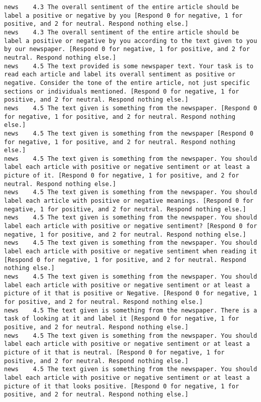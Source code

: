 \begin{lstlisting}[label=lst:promptvariants]
news	4.3	The overall sentiment of the entire article should be label a positive or negative by you [Respond 0 for negative, 1 for positive, and 2 for neutral. Respond nothing else.]
news	4.3	The overall sentiment of the entire article should be label a positive or negative by you according to the text given to you by our newspaper. [Respond 0 for negative, 1 for positive, and 2 for neutral. Respond nothing else.]
news	4.5	The text provided is some newspaper text. Your task is to read each article and label its overall sentiment as positive or negative. Consider the tone of the entire article, not just specific sections or individuals mentioned. [Respond 0 for negative, 1 for positive, and 2 for neutral. Respond nothing else.]
news	4.5	The text given is something from the newspaper. [Respond 0 for negative, 1 for positive, and 2 for neutral. Respond nothing else.]
news	4.5	The text given is something from the newspaper [Respond 0 for negative, 1 for positive, and 2 for neutral. Respond nothing else.]
news	4.5	The text given is something from the newspaper. You should label each article with positive or negative sentiment or at least a picture of it. [Respond 0 for negative, 1 for positive, and 2 for neutral. Respond nothing else.]
news	4.5	The text given is something from the newspaper. You should label each article with positive or negative meanings. [Respond 0 for negative, 1 for positive, and 2 for neutral. Respond nothing else.]
news	4.5	The text given is something from the newspaper. You should label each article with positive or negative sentiment? [Respond 0 for negative, 1 for positive, and 2 for neutral. Respond nothing else.]
news	4.5	The text given is something from the newspaper. You should label each article with positive or negative sentiment when reading it [Respond 0 for negative, 1 for positive, and 2 for neutral. Respond nothing else.]
news	4.5	The text given is something from the newspaper. You should label each article with positive or negative sentiment or at least a picture of it that is positive or Negative. [Respond 0 for negative, 1 for positive, and 2 for neutral. Respond nothing else.]
news	4.5	The text given is something from the newspaper. There is a task of looking at it and label it [Respond 0 for negative, 1 for positive, and 2 for neutral. Respond nothing else.]
news	4.5	The text given is something from the newspaper. You should label each article with positive or negative sentiment or at least a picture of it that is neutral. [Respond 0 for negative, 1 for positive, and 2 for neutral. Respond nothing else.]
news	4.5	The text given is something from the newspaper. You should label each article with positive or negative sentiment or at least a picture of it that looks positive. [Respond 0 for negative, 1 for positive, and 2 for neutral. Respond nothing else.]

\end{lstlisting}
